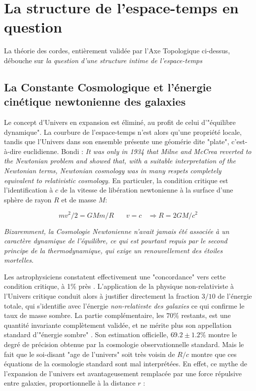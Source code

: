 \documentclass[a4paper,9pt]{article}
\newcounter{row}
\begin{document}
\section{La structure de l'espace-temps en question}
La théorie des cordes, entièrement validée par l'Axe Topologique ci-dessus, débouche sur \textit{la question d'une structure intime de l'espace-temps} \cite{Schwarz}

\subsection{La Constante Cosmologique et l'énergie cinétique newtonienne des galaxies}
Le concept d'Univers en expansion est éliminé, au profit de celui d'"équilibre dynamique". La courbure de l'espace-temps n'est alors qu'une propriété locale, tandis que l'Univers dans son ensemble présente une géomérie dite "plate", c'est-à-dire euclidienne. Bondi \cite{Bondi} : \textit{It was only in 1934 that Milne and McCrea reverted to the Newtonian problem and showed that, with a suitable interpretation of the Newtonian terms, Newtonian cosmology was in many respets completely equivalent to relativistic cosmology.} En particuler, la condition critique est l'identification à $c$ de la vitesse de libération newtonienne à la surface d'une sphère de rayon $R$ et de masse $M$:

\begin{equation}
mv^2/2 = GMm/R ~~~~~~~~ v = c ~~~~ \Rightarrow R = 2GM/c^2     
\end{equation}

\textit{Bizaremment, la Cosmologie Newtonienne n'avait jamais été associée à un caractère dynamique de l'équilibre, ce qui est pourtant requis par le second principe de la thermodynamique, qui exige un renouvellement des étoiles mortelles}.


Les astrophysiciens constatent effectivement une "concordance" vers cette condition critique, à 1\% près \cite{Tanabashi}. L'application de la physique non-relativiste à l'Univers critique conduit alors à justifier directement la fraction $3/10$ de l'énergie totale, qui s'identifie avec l'énergie \textit{non-relativste des galaxies} ce qui confirme le taux de masse sombre. La partie complémentaire, les $70\%$ restants, est une quantité invariante complètement validée, et ne mérite plus son appellation standard d'"énergie sombre" \cite{Sanchez2}. Son estimation officielle, $69.2 \pm 1.2 \%$ \cite{Tanabashi} montre le degré de précision obtenue par la cosmologie observationnelle standard. Mais le fait que le soi-disant "age de l'univers" soit très voisin de $R/c$ montre que ces équations de la cosmologie standard sont mal interprétées. En effet, ce mythe de l'expansion de l'univers est avantageusement remplacée par une force répulsive entre galaxies, proportionnelle à la distance $r$ \cite{Davies2}:   
\end{document}
